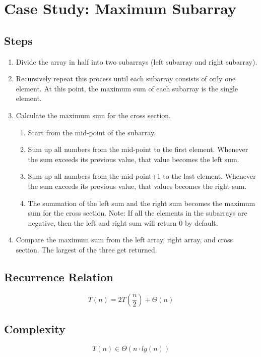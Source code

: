 \section{Case Study: Maximum Subarray}

\subsection*{Steps}

\begin{enumerate}
	\item Divide the array in half into two subarrays (left subarray and right subarray).
	\item Recursively repeat this process until each subarray consists of only one element. At this point, the maximum sum of each subarray is the single element.
	\item Calculate the maximum sum for the cross section.
	\begin{enumerate}
		\item Start from the mid-point of the subarray.
		\item Sum up all numbers from the mid-point to the first element. Whenever the sum exceeds its previous value, that value becomes the left sum.
		\item Sum up all numbers from the mid-point+1 to the last element. Whenever the sum exceeds its previous value, that values becomes the right sum.
		\item The summation of the left sum and the right sum becomes the maximum sum for the cross section. Note: If all the elements in the subarrays are negative, then the left and right sum will return 0 by default.
	\end{enumerate}
	\item Compare the maximum sum from the left array, right array, and cross section. The largest of the three get returned.
\end{enumerate}

\subsection*{Recurrence Relation}
$$
T(n) = 2T(\frac{n}{2}) + \Theta(n)
$$

\subsection*{Complexity}
$$
T(n) \in \Theta(n \cdot lg(n))
$$

\newpage

